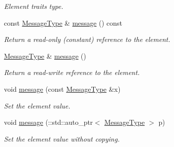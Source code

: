 \begin{DoxyCompactItemize}
\begin{DoxyCompactList}\small\item\em Element traits type. \item\end{DoxyCompactList}\item 
const \hyperlink{classopenstack_1_1xml_1_1CloudServersAPIFault_aff7b9d2067747fa033a0ea4408011af6}{MessageType} \& \hyperlink{classopenstack_1_1xml_1_1CloudServersAPIFault_a25d6802198e4c974ca8f1a1bfc36800a}{message} () const 
\begin{DoxyCompactList}\small\item\em Return a read-\/only (constant) reference to the element. \item\end{DoxyCompactList}\item 
\hyperlink{classopenstack_1_1xml_1_1CloudServersAPIFault_aff7b9d2067747fa033a0ea4408011af6}{MessageType} \& \hyperlink{classopenstack_1_1xml_1_1CloudServersAPIFault_a66210d9fab1a2c27098e9a2f1bf52d1b}{message} ()
\begin{DoxyCompactList}\small\item\em Return a read-\/write reference to the element. \item\end{DoxyCompactList}\item 
void \hyperlink{classopenstack_1_1xml_1_1CloudServersAPIFault_a5b3e38edf3b8424b411013cf4a51d631}{message} (const \hyperlink{classopenstack_1_1xml_1_1CloudServersAPIFault_aff7b9d2067747fa033a0ea4408011af6}{MessageType} \&x)
\begin{DoxyCompactList}\small\item\em Set the element value. \item\end{DoxyCompactList}\item 
void \hyperlink{classopenstack_1_1xml_1_1CloudServersAPIFault_a814e04122088267dfa102e3d2fe7cb60}{message} (::std::auto\_\-ptr$<$ \hyperlink{classopenstack_1_1xml_1_1CloudServersAPIFault_aff7b9d2067747fa033a0ea4408011af6}{MessageType} $>$ p)
\begin{DoxyCompactList}\small\item\em Set the element value without copying. \item\end{DoxyCompactList}\end{DoxyCompactItemize}
